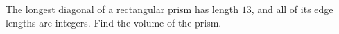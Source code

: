 The longest diagonal of a rectangular prism has length $13$, and all of its edge lengths are integers. Find the volume of the prism.
